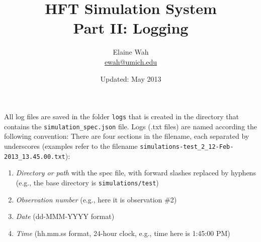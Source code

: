 \documentclass[11pt]{article}
\begin{document}
	
\title{HFT Simulation System \\
Part II: Logging}
\author{
Elaine Wah\\
\href{mailto:ewah@umich.edu}{ewah@umich.edu}
}
\date{Updated: May 2013}
\maketitle


%


%


All log files are saved in the folder \verb|logs| that is created in the directory that contains the \verb|simulation_spec.json| file.
Logs (.txt files) are named according the following convention: There are four sections in the filename, each separated by underscores (examples refer to the filename \verb|simulations-test_2_12-Feb-2013_13.45.00.txt|):
\begin{enumerate}[(1)]
\item \emph{Directory or path} with the spec file, with forward slashes replaced by hyphens (e.g., the base directory is \verb|simulations/test|)
\item \emph{Observation number} (e.g., here it is observation \#2)
\item \emph{Date} (dd-MMM-YYYY format)
\item \emph{Time} (hh.mm.ss format, 24-hour clock, e.g., time here is 1:45:00 PM)
\end{enumerate}
\end{document}
